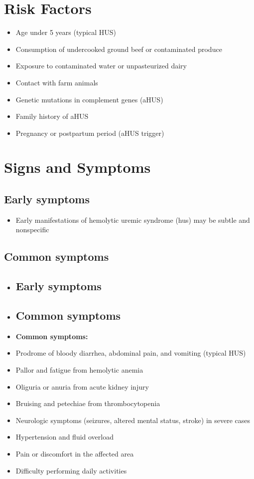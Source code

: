 \section{Risk Factors}

\begin{itemize}[noitemsep]
  \item Age under 5 years (typical HUS)
  \item Consumption of undercooked ground beef or contaminated produce
  \item Exposure to contaminated water or unpasteurized dairy
  \item Contact with farm animals
  \item Genetic mutations in complement genes (aHUS)
  \item Family history of aHUS
  \item Pregnancy or postpartum period (aHUS trigger)
\end{itemize}

\section{Signs and Symptoms}

\subsection{Early symptoms}
\begin{itemize}[noitemsep]
  \item Early manifestations of hemolytic uremic syndrome (hus) may be subtle and nonspecific
\end{itemize}

\subsection{Common symptoms}
\begin{itemize}[noitemsep]
  \item \subsection{Early symptoms}
  \item \subsection{Common symptoms}
  \item \textbf{Common symptoms:}
  \item Prodrome of bloody diarrhea, abdominal pain, and vomiting (typical HUS)
  \item Pallor and fatigue from hemolytic anemia
  \item Oliguria or anuria from acute kidney injury
  \item Bruising and petechiae from thrombocytopenia
  \item Neurologic symptoms (seizures, altered mental status, stroke) in severe cases
  \item Hypertension and fluid overload
  \item Pain or discomfort in the affected area
  \item Difficulty performing daily activities
\end{itemize}

